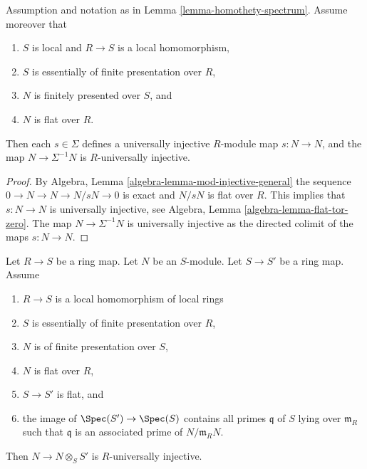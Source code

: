 \begin{lemma}
\label{lemma-homothety-universally-injective}
Assumption and notation as in
Lemma \ref{lemma-homothety-spectrum}.
Assume moreover that
\begin{enumerate}
\item $S$ is local and $R \to S$ is a local homomorphism,
\item $S$ is essentially of finite presentation over $R$,
\item $N$ is finitely presented over $S$, and
\item $N$ is flat over $R$.
\end{enumerate}
Then each $s \in \Sigma$ defines a
universally injective $R$-module map $s : N \to N$, and the
map $N \to \Sigma^{-1}N$ is $R$-universally injective.
\end{lemma}

\begin{proof}
By
Algebra, Lemma \ref{algebra-lemma-mod-injective-general}
the sequence $0 \to N \to N \to N/sN \to 0$ is exact and
$N/sN$ is flat over $R$. This implies that $s : N \to N$
is universally injective, see
Algebra, Lemma \ref{algebra-lemma-flat-tor-zero}.
The map $N \to \Sigma^{-1}N$ is universally injective as the directed
colimit of the maps $s : N \to N$.
\end{proof}

\begin{lemma}
\label{lemma-base-change-universally-flat-local}
Let $R \to S$ be a ring map.
Let $N$ be an $S$-module.
Let $S \to S'$ be a ring map.
Assume
\begin{enumerate}
\item $R \to S$ is a local homomorphism of local rings
\item $S$ is essentially of finite presentation over $R$,
\item $N$ is of finite presentation over $S$,
\item $N$ is flat over $R$,
\item $S \to S'$ is flat, and
\item the image of $\Spec(S') \to \Spec(S)$ contains
all primes $\mathfrak q$ of $S$ lying over $\mathfrak m_R$
such that $\mathfrak q$ is an associated prime of $N/\mathfrak m_R N$.
\end{enumerate}
Then $N \to N \otimes_S S'$ is $R$-universally injective.
\end{lemma}

